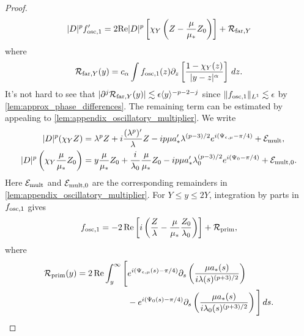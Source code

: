 \documentclass[11pt]{amsart}
\theoremstyle{definition}
\theoremstyle{remark}
\numberwithin{equation}{section}
\newcommand{\mc}[1]{\mathcal{#1}}
\newcommand{\ang}[1]{\langle #1 \rangle}
\begin{document}
\begin{proof}
\begin{equation}
    |D|^pf_{\textup{osc},1}' = 2\text{Re}|D|^p \left[\chi_Y\left(Z - \frac{\mu}{\mu_*}Z_0\right)\right] + \mc{R}_{\textup{far},Y}
    \end{equation}
    where
    \begin{equation}\label{eqn:approx_E5_far_remainder}
    \mc{R}_{\textup{far},Y}(y) = c_\alpha \int f_{\textup{osc},1}(z)\partial_z \left[\frac{1 - \chi_Y(z)}{|y - z|^\alpha}\right] \, dz.
    \end{equation}
    It's not hard to see that $|\partial^j \mc{R}_{\textup{far},Y}(y)| \lesssim \epsilon \ang{y}^{-p-2-j}$ since $\|f_{\textup{osc},1}\|_{L^1} \lesssim \epsilon$ by \cref{lem:approx_phase_differences}. The remaining term can be estimated by appealing to \cref{lem:appendix_oscillatory_multiplier}. We write
    \begin{equation}\label{eqn:approx_E5_multiplier_expansions}
    \begin{aligned}
        |D|^p(\chi_Y Z)
        &=\lambda^p Z+i\frac{(\lambda^p)'}{\lambda}Z
        -ip\mu a_*'\lambda^{(p-3)/2}e^{i(\Psi_{\epsilon,\mu}-\pi/4)}+\mc{E}_{\textup{mult}},\\
        |D|^p\left(\chi_Y\frac{\mu}{\mu_*}Z_0\right)
        &=y\frac{\mu}{\mu_*}Z_0+\frac{i}{\lambda_0}\frac{\mu}{\mu_*}Z_0
        -ip\mu a_*'\lambda_0^{(p-3)/2}e^{i(\Psi_0-\pi/4)}+\mc{E}_{\textup{mult},0}.
    \end{aligned}
    \end{equation}
    Here $\mc{E}_{\textup{mult}}$ and $\mc{E}_{\textup{mult},0}$ are the corresponding remainders in \cref{lem:appendix_oscillatory_multiplier}.
    For $Y\leq y\leq2Y$, integration by parts in $f_{\textup{osc},1}$ gives
    \begin{equation}\label{eqn:approx_E5_fundamental_primitive}
        f_{\textup{osc},1}
        =-2\operatorname{Re}\left[i\left(\frac{Z}{\lambda}
        -\frac{\mu}{\mu_*}\frac{Z_0}{\lambda_0}\right)\right]+\mc{R}_{\textup{prim}},
    \end{equation}
    where
    \begin{equation}\label{eqn:approx_E5_primitive_remainder}
    \begin{aligned}
        \mc{R}_{\textup{prim}}(y)=2\operatorname{Re}\int_y^\infty\Bigg[
        &e^{i(\Psi_{\epsilon,\mu}(s)-\pi/4)}
        \partial_s\left(\frac{\mu a_*(s)}{i\lambda(s)^{(p+3)/2}}\right)\\
        &-e^{i(\Psi_0(s)-\pi/4)}
        \partial_s\left(\frac{\mu a_*(s)}{i\lambda_0(s)^{(p+3)/2}}\right)
        \Bigg]\,ds.
    \end{aligned}

\end{equation}
\end{proof}
\end{document}
